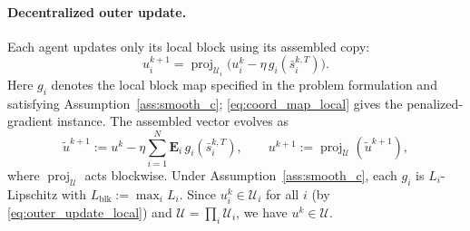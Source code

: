 \documentclass[letterpaper, 10 pt, conference]{ieeeconf} %
\DeclareMathOperator{\proj}{proj}
\begin{document}
\paragraph{Decentralized outer update.}
Each agent updates only its local block using its assembled copy:
\begin{equation}\label{eq:outer_update_local}
u_i^{k+1}
=
\proj_{\mathcal{U}_i}\!\Big(
u_i^{k}-\eta\, g_i\!\left(\bar s_i^{k,T}\right)
\Big).
\end{equation}
Here \(g_i\) denotes the local block map specified in the problem formulation and satisfying Assumption~\ref{ass:smooth_c}; \eqref{eq:coord_map_local} gives the penalized-gradient instance. The assembled vector evolves as
\begin{equation}\label{eq:outer_update_assembled}
\tilde u^{k+1} := u^{k} - \eta \sum_{i=1}^N \mathbf{E}_i\, g_i\!\left(\bar s_i^{k,T}\right),
\qquad
u^{k+1} := \proj_{\mathcal{U}}(\tilde u^{k+1}),
\end{equation}
where $\proj_{\mathcal U}$ acts blockwise. Under Assumption~\ref{ass:smooth_c}, each $g_i$ is $L_i$-Lipschitz with $L_{\mathrm{blk}}:=\max_i L_i$. Since $u_i^k\in\mathcal U_i$ for all $i$ (by \eqref{eq:outer_update_local}) and $\mathcal U=\prod_i \mathcal U_i$, we have $u^k\in\mathcal U$.
\end{document}
